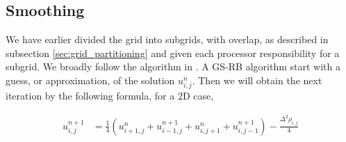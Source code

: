 

	\subsection{Smoothing}

		We have earlier divided the grid into subgrids, with overlap, as described
		in subsection \ref{sec:grid_partitioning} and given each processor
		responsibility for a subgrid. We broadly follow the algorithm in \cite{adams_distributed_2001}.
		A GS-RB algorithm start with a
		guess, or approximation, of the solution \(u^{n}_{i,j}\). Then we will obtain the next iteration by
		the following formula, for a \(2\)D case,

		\begin{align}
			u^{n+1}_{i,j} &= \frac{1}{4}\left( u^n_{i+1,j} + u^{n +1}_{i-1,j} + u^{n}_{i, j+1} + u^{n+1}_{i,j-1}  \right) - \frac{\Delta^2 \rho_{i,j}}{4}
		\end{align}

